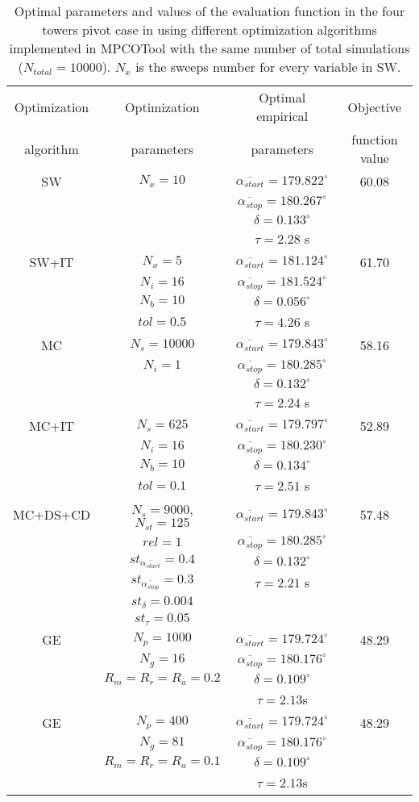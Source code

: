 \documentclass[review,authoryear]{elsarticle}
\newcommand{\TABLE}[5]
{
	\begin{table}[ht!]
		\centering
		\caption{#4.\label{#5}}
		#1
		\begin{tabular}{#2}
			#3
		\end{tabular}
	\end{table}
}
\begin{document}
\TABLE{\scriptsize}{cccc}
{
	Optimization & Optimization & Optimal empirical & Objective
	\\ algorithm & parameters & parameters & function value
	\\ \hline
	SW & $N_x=10$ & $\overline{\alpha_{start}}=179.822^\circ$
	& 60.08
	\\ & & $\overline{\alpha_{stop}}=180.267^\circ$
	\\ & & $\delta=0.133^\circ$
	\\ & & $\tau=2.28$ s
	\\ \hline
	SW+IT & $N_x=5$ & $\overline{\alpha_{start}}=181.124^\circ$
	& 61.70
	\\ & $N_i=16$ & $\overline{\alpha_{stop}}=181.524^\circ$
	\\ & $N_b=10$ & $\delta=0.056^\circ$
	\\ & $tol=0.5$ & $\tau=4.26$ s
	\\ \hline
	MC & $N_s=10000$
	& $\overline{\alpha_{start}}=179.843^\circ$ & 58.16
	\\ & $N_i=1$ & $\overline{\alpha_{stop}}=180.285^\circ$
	\\ & & $\delta=0.132^\circ$
	\\ & & $\tau=2.24$ s
	\\ \hline
	MC+IT & $N_s=625$
	& $\overline{\alpha_{start}}=179.797^\circ$ & 52.89
	\\ & $N_i=16$ & $\overline{\alpha_{stop}}=180.230^\circ$
	\\ & $N_b=10$ & $\delta=0.134^\circ$
	\\ & $tol=0.1$ & $\tau=2.51$ s
	\\ \hline
	MC+DS+CD & $N_s=9000$, $N_{st}=125$
	& $\overline{\alpha_{start}}=179.843^\circ$ & 57.48
	\\ & $rel=1$ & $\overline{\alpha_{stop}}=180.285^\circ$
	\\ & $st_{\overline{\alpha_{start}}}=0.4$ & $\delta=0.132^\circ$
	\\ & $st_{\overline{\alpha_{stop}}}=0.3$ & $\tau=2.21$ s
	\\ & $st_\delta=0.004$
	\\ & $st_\tau=0.05$
	\\ \hline
	GE & $N_p=1000$ & $\overline{\alpha_{start}}=179.724^\circ$
	& 48.29
	\\ & $N_g=16$ & $\overline{\alpha_{stop}}=180.176^\circ$
	\\ & $R_m=R_r=R_a=0.2$ & $\delta=0.109^\circ$
	\\ & & $\tau=2.13$s
	\\ \hline
	GE & $N_p=400$ & $\overline{\alpha_{start}}=179.724^\circ$
	& 48.29
	\\ & $N_g=81$ & $\overline{\alpha_{stop}}=180.176^\circ$
	\\ & $R_m=R_r=R_a=0.1$ & $\delta=0.109^\circ$
	\\ & & $\tau=2.13$s
	\\ \hline
}{Optimal parameters and values of the evaluation function in the four towers pivot case in \citet{Ouazaa15} using different optimization algorithms implemented in MPCOTool with the same number of total simulations ($N_{total}=10000$). $N_x$ is the sweeps number for every variable in SW}{TabPivot}
\end{document}
